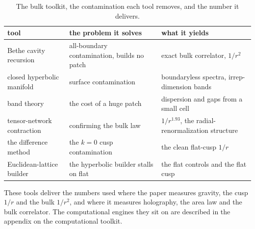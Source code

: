 \begin{table}[ht]
\centering
\begin{tabular}{@{}p{3.3cm}p{4.6cm}p{4.2cm}@{}}
\toprule
tool & the problem it solves & what it yields \\
\midrule
Bethe cavity recursion & all-boundary contamination, builds no patch & exact bulk correlator, $1/r^2$ \\
closed hyperbolic manifold & surface contamination & boundaryless spectra, irrep-dimension bands \\
band theory & the cost of a huge patch & dispersion and gaps from a small cell \\
tensor-network contraction & confirming the bulk law & $1/r^{1.93}$, the radial-renormalization structure \\
the difference method & the $k=0$ cusp contamination & the clean flat-cusp $1/r$ \\
Euclidean-lattice builder & the hyperbolic builder stalls on flat & the flat controls and the flat cusp \\
\bottomrule
\end{tabular}
\caption{The bulk toolkit, the contamination each tool removes, and the number it delivers.}
\label{tab:bulk-toolkit}
\end{table}

These tools deliver the numbers used where the paper measures gravity, the cusp $1/r$ and the bulk $1/r^2$, and where it measures holography, the area law and the bulk correlator. The computational engines they sit on are described in the appendix on the computational toolkit.
